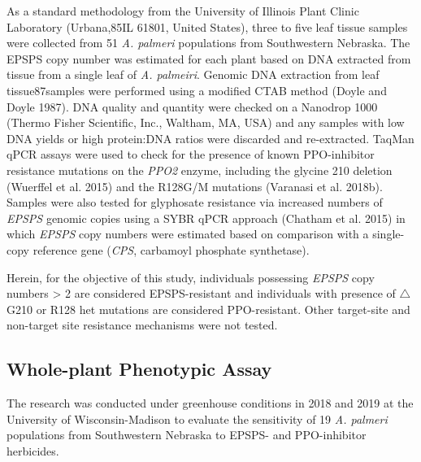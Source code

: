 \documentclass[
  12pt,
  a4paper]{article}
\begin{document}
As a standard methodology from the University of Illinois Plant Clinic
Laboratory (Urbana,85IL 61801, United States), three to five leaf tissue
samples were collected from 51 \emph{A. palmeri} populations from
Southwestern Nebraska. The EPSPS copy number was estimated for each
plant based on DNA extracted from tissue from a single leaf of \emph{A.
palmeiri}. Genomic DNA extraction from leaf tissue87samples were
performed using a modified CTAB method (Doyle and Doyle 1987). DNA
quality and quantity were checked on a Nanodrop 1000 (Thermo Fisher
Scientific, Inc., Waltham, MA, USA) and any samples with low DNA yields
or high protein:DNA ratios were discarded and re-extracted. TaqMan qPCR
assays were used to check for the presence of known PPO-inhibitor
resistance mutations on the \emph{PPO2} enzyme, including the glycine
210 deletion (Wuerffel et al. 2015) and the R128G/M mutations (Varanasi
et al. 2018b). Samples were also tested for glyphosate resistance via
increased numbers of \emph{EPSPS} genomic copies using a SYBR qPCR
approach (Chatham et al. 2015) in which \emph{EPSPS} copy numbers were
estimated based on comparison with a single-copy reference gene
(\emph{CPS}, carbamoyl phosphate synthetase).

Herein, for the objective of this study, individuals possessing
\emph{EPSPS} copy numbers \textgreater{} 2 are considered
EPSPS-resistant and individuals with presence of \(\triangle\)G210 or
R128 het mutations are considered PPO-resistant. Other target-site and
non-target site resistance mechanisms were not tested.

\hypertarget{whole-plant-phenotypic-assay}{%
\subsection{Whole-plant Phenotypic
Assay}\label{whole-plant-phenotypic-assay}}

The research was conducted under greenhouse conditions in 2018 and 2019
at the University of Wisconsin-Madison to evaluate the sensitivity of 19
\emph{A. palmeri} populations from Southwestern Nebraska to EPSPS- and
PPO-inhibitor herbicides.
\end{document}
